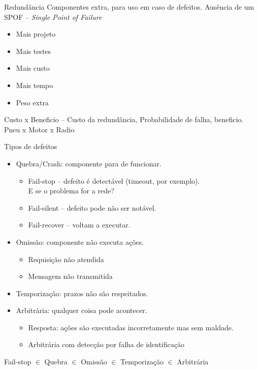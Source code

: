 \begin{frame}{Redundância}
Componentes extra, para uso em caso de defeitos. Ausência de um SPOF -- \emph{Single Point of Failure}
\pause
\begin{itemize}
	\item Mais projeto
	\item Mais testes
	\item Mais custo
	\item Mais tempo
	\item Peso extra
\end{itemize}

\pause Custo x Beneficio -- Custo da redundância, Probabilidade de falha, beneficio.\\
\pause Pneu x Motor x Radio



\end{frame}

\begin{frame}[allowframebreaks]{Tipos de defeitos}
\begin{itemize}
	\item Quebra/Crash: componente para de funcionar.
	\begin{itemize}
		\item Fail-stop -- defeito é detectável (timeout, por exemplo).\\
		E se o problema for a rede?
		\item Fail-silent -- defeito pode não ser notável.
		\item Fail-recover -- voltam a executar.
	\end{itemize}

	\item Omissão: componente não executa ações.
	\begin{itemize}
		\item Requisição não atendida
		\item Mensagem não transmitida
	\end{itemize}

	\item Temporização: prazos não são respeitados.
		
	\item Arbitrária: qualquer coisa pode acontecer.
	\begin{itemize}
		\item Resposta: ações são executadas incorretamente mas sem maldade.
		\item Arbitrária com detecção por falha de identificação
	\end{itemize}
\end{itemize}

Fail-stop $\in$ Quebra $\in$ Omissão $\in$ Temporização $\in$ Arbitrária

\end{frame}


